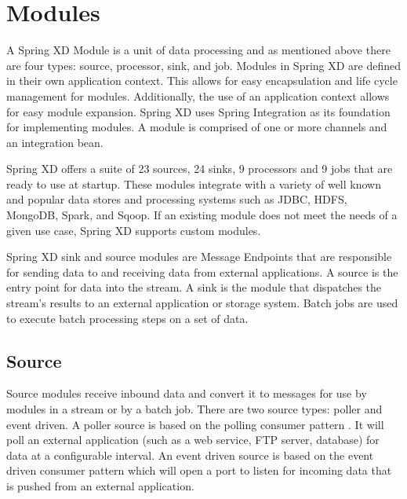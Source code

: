\section{Modules}
\label{sec:Modules}
A Spring XD Module \cite{modules} is a unit of data processing and as mentioned above 
there are four types: source, processor, sink, and job. Modules in Spring XD are defined 
in their own application context. This allows for easy encapsulation and life cycle 
management for modules. Additionally, the use of an application context allows for easy 
module expansion.  Spring XD uses Spring Integration \cite{spring-integration-reference} 
as its foundation for implementing modules. A module is comprised of one or more channels 
and an integration bean.

\par

Spring XD offers a suite of 23 sources, 24 sinks, 9 processors and 9 jobs that are ready 
to use at startup.  These modules integrate with a variety of well
known and popular data stores and processing systems such as JDBC, HDFS, MongoDB, Spark,
and Sqoop.  If an existing module does not meet the needs of a given use case, Spring XD
supports custom modules.

Spring XD sink and source modules are Message Endpoints 
\cite{enterprise-integration-pattern-message-endpoint} 
that are responsible for sending data to and receiving data from external applications.
A source is the entry point for data into the stream. A sink is the module that dispatches
the stream's results to an external application or storage system. Batch jobs are used to
execute batch processing steps on a set of data.

\par

\subsection{Source}
\label{sec:Source}
Source modules receive inbound data and convert it to messages for
use by modules in a stream or by a batch job.
There are two source types: poller and event driven.  A poller source is based on the polling
consumer pattern \cite{enterprise-integration-pattern-pollingconsumer}. It
will poll an external application (such as a web service, FTP server, database) for data at a
configurable interval. An event driven source is based on the event driven
consumer pattern \cite{enterprise-integration-pattern-eventdrivenconsumer} which will
open a port to listen for incoming data that is pushed from an external application.


